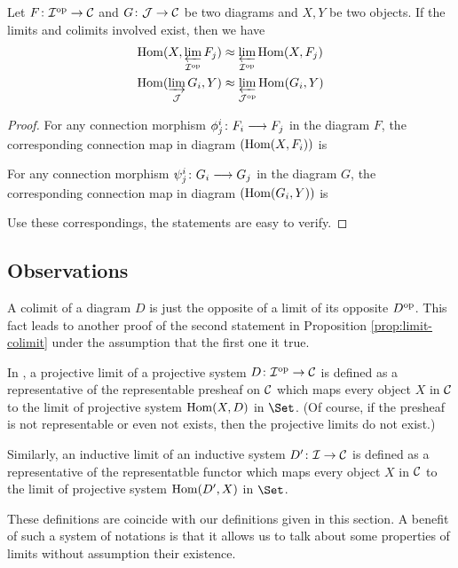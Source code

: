 \begin{prop}\label{prop:limit-colimit}
  Let $F\colon{\cal I}^{\operatorname{op}}\to{\cal C}$ and $G\colon{\cal J}\to{\cal C}$ be two diagrams and $X, Y$ be two objects. If the limits and colimits involved exist, then we have
  \begin{align*}
    \operatorname{Hom}(X,\operatorname*{\underleftarrow{\lim}}_{{\cal I}^{\operatorname{op}}} F_j) &\approx \operatorname*{\underleftarrow{\lim}}_{{\cal I}^{\operatorname{op}}} \operatorname{Hom}(X,F_j) \\
    \operatorname{Hom}(\operatorname*{\underrightarrow{\lim}}_{{\cal J}} G_i, Y) &\approx \operatorname*{\underleftarrow{\lim}}_{{\cal J}^{\operatorname{op}}} \operatorname{Hom}(G_i,Y)
  \end{align*}
\end{prop}
  \begin{proof}
    For any connection morphism $\phi^i_j\colon F_i\longrightarrow F_j$ in the diagram $F$, the corresponding connection map in diagram $(\operatorname{Hom}(X,F_i))$ is

    For any connection morphism $\psi^i_j\colon G_i\longrightarrow G_j$ in the diagram $G$, the corresponding connection map in diagram $(\operatorname{Hom}(G_i,Y))$ is

    Use these correspondings, the statements are easy to verify.
  \end{proof}
\subsection{Observations}
  \begin{ex}
    A colimit of a diagram $D$ is just the opposite of a limit of its opposite $D^{\operatorname{op}}$. This fact leads to another proof of the second statement in Proposition \ref{prop:limit-colimit} under the assumption that the first one it true.
  \end{ex}
  \begin{ex}\label{def:limit as rep functor}
    In \cite{Cat&Shf}, a projective limit of a projective system $D\colon{\cal I}^{\operatorname{op}}\to{\cal C}$ is defined as a representative of the representable presheaf on ${\cal C}$ which maps every object $X$ in ${\cal C}$ to the limit of projective system $\operatorname{Hom}(X,D)$ in $\Set$.
    (Of course, if the presheaf is not representable or even not exists, then the projective limits do not exist.)

    Similarly, an inductive limit of an inductive system $D'\colon{\cal I}\to{\cal C}$ is defined as a representative of the representatble functor which maps every object $X$ in ${\cal C}$ to the limit of projective system $\operatorname{Hom}(D',X)$ in $\Set$.

    These definitions are coincide with our definitions given in this section. A benefit of such a system of notations is that it allows us to talk about some properties of limits without assumption their existence.
  \end{ex}

